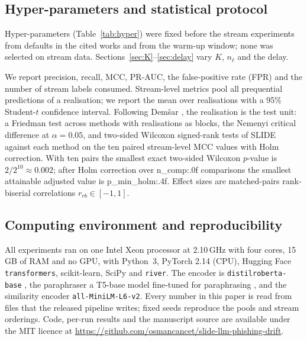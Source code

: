 \subsection{Hyper-parameters and statistical protocol}
Hyper-parameters (Table~\ref{tab:hyper}) were fixed before the stream experiments from defaults in the cited works and from the warm-up window; none was selected on stream data. Sections~\ref{sec:K}--\ref{sec:delay} vary $K$, $n_\ell$ and the delay.



We report precision, recall, MCC, PR-AUC, the false-positive rate (FPR) and the number of stream labels consumed. Stream-level metrics pool all prequential predictions of a realisation; we report the mean over realisations with a 95\% Student-$t$ confidence interval. Following Dem\v{s}ar \cite{demsar2006}, the realisation is the test unit: a Friedman test across methods with realisations as blocks, the Nemenyi critical difference at $\alpha=0.05$, and two-sided Wilcoxon signed-rank tests of SLIDE against each method on the ten paired stream-level MCC values with Holm correction. With ten pairs the smallest exact two-sided Wilcoxon $p$-value is $2/2^{10}\approx0.002$; after Holm correction over {{n_comp:.0f}} comparisons the smallest attainable adjusted value is {{p_min_holm:.4f}}. Effect sizes are matched-pairs rank-biserial correlations $r_{rb}\in[-1,1]$.

\subsection{Computing environment and reproducibility}\label{sec:repro}
All experiments ran on one Intel Xeon processor at 2.10\,GHz with four cores, 15\,GB of RAM and no GPU, with Python~3, PyTorch 2.14 (CPU), Hugging Face \texttt{transformers}, scikit-learn, SciPy and \texttt{river}. The encoder is \texttt{distilroberta-base} \cite{sanh2019,liu2019roberta}, the paraphraser a T5-base model fine-tuned for paraphrasing \cite{hf_paraphraser}, and the similarity encoder \texttt{all-MiniLM-L6-v2}. Every number in this paper is read from files that the released pipeline writes; fixed seeds reproduce the pools and stream orderings. Code, per-run results and the manuscript source are available under the MIT licence at \url{https://github.com/osmancancet/slide-llm-phishing-drift}.
